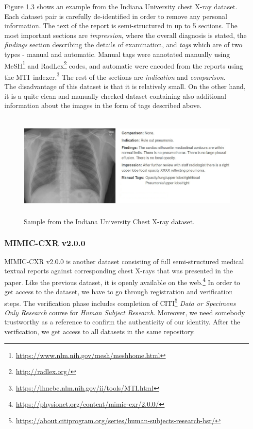 Figure \hyperref[fig03:IUChestXRaySample]{1.3} shows an example from the Indiana University chest X-ray dataset. Each dataset pair is carefully de-identified in order to remove any personal information. The text of the report is semi-structured in up to 5 sections. The most important sections are \textit{impression}, where the overall diagnosis is stated, the \textit{findings} section describing the details of examination, and \textit{tags} which are of two types - manual and automatic. Manual tags were annotated manually using MeSH\footnote[4]{\url{https://www.nlm.nih.gov/mesh/meshhome.html}} and RadLex\footnote[5]{\url{http://radlex.org/}} codes, and automatic were encoded from the reports using the MTI~indexer.\footnote[6]{\url{https://lhncbc.nlm.nih.gov/ii/tools/MTI.html}} The rest of the sections are \textit{indication} and \textit{comparison}.\\

The disadvantage of this dataset is that it is relatively small. On the other hand, it is a quite clean and manually checked dataset containing also additional information about the images in the form of tags described above.

\begin{figure}[h]\centering
\includegraphics[width=145mm, height=53mm]{../img/IUChestXRaySample_CXR1728_IM-0479-1001}
\caption{Sample from the Indiana University Chest X-ray dataset.}
\label{fig03:IUChestXRaySample}
\end{figure}

\subsubsection{MIMIC-CXR v2.0.0}
MIMIC-CXR v2.0.0 is another dataset consisting of full semi-structured medical textual reports against corresponding chest X-rays that was presented in the \citet{cxr:johnson2019mimic} paper. Like the previous dataset, it is openly available on the web.\footnote[7]{\url{https://physionet.org/content/mimic-cxr/2.0.0/}} In order to get access to the dataset, we have to go through registration and verification steps. The verification phase includes completion of CITI\footnote[8]{\url{https://about.citiprogram.org/series/human-subjects-research-hsr/}} \textit{Data or Specimens Only Research} course for \textit{Human Subject Research}. Moreover, we need somebody trustworthy as a reference to confirm the authenticity of our identity. After the verification, we get access to all datasets in the same repository.\\

